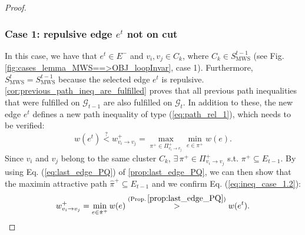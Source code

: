 \begin{proof}
\subsubsection*{Case 1: repulsive edge $e^t$ not on cut}\label{case:repuslive_edge_not_on_cut}
In this case, we have that $e^{t}\in E^{-}$ and ${v_{i},v_{j}\in C_{k}}$, where $C_{k}\in S_{\mathrm{MWS}}^{t-1}$ (see Fig. \ref{fig:cases_lemma_MWS==>OBJ_loopInvar}, case 1). Furthermore, $S_{\mathrm{MWS}}^{t}=S_{\mathrm{MWS}}^{t-1}$ because the selected edge $e^t$ is repulsive. \autoref{cor:previous_path_ineq_are_fulfilled} proves that all previous path inequalities that were fulfilled on $\mathcal{G}_{t-1}$ are also fulfilled on $\mathcal{G}_{t}$. In addition to these, the new edge $e^t$ defines a new path inequality of type (\ref{eq:path_rel_1}), which needs to be verified:
\begin{equation}
w(e^{t}) \stackrel{?}{<} w_{v_{i}\rightarrow v_{j}}^{+} = \max_{\pi^{+}\in\Pi_{v_{i}\rightarrow v_{j}}^{+}}\underset{e\in\pi^{+}}{\min}w(e).\label{eq:ineq_case_1.2}
\end{equation}
Since $v_{i}$ and $v_{j}$ belong to the same cluster $C_{k}$, $\exists \, \pi^+\in \Pi_{v_{i}\rightarrow v_{j}}^{+}$ s.t. $\pi^+\subseteq E_{t-1}$. By using Eq. (\ref{eq:last_edge_PQ}) of \autoref{prop:last_edge_PQ}, we can then show that the maximin attractive path $\hat{\pi}^+\subseteq E_{t-1}$ and we confirm Eq. (\ref{eq:ineq_case_1.2}):
\begin{equation}
w_{v_{i}\rightarrow v_{j}}^{+} = \min_{e\in\hat{\pi}^{+}}  w(e) \stackrel{\mathrm{(Prop.\,\ref{prop:last_edge_PQ})}}{>} w(e^{t}).
\end{equation}



\end{proof}
